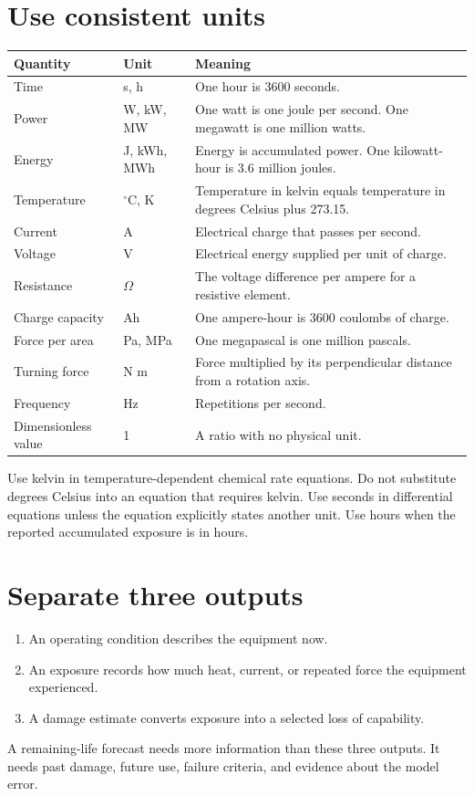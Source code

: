 \documentclass[11pt,a4paper]{report}
\begin{document}
\section{Use consistent units}
\begin{longtable}{L{0.22\textwidth}L{0.19\textwidth}L{0.49\textwidth}}
\toprule Quantity & Unit & Meaning \\ \midrule\endhead
Time & s, h & One hour is 3600 seconds. \\
Power & W, kW, MW & One watt is one joule per second. One megawatt is one million watts. \\
Energy & J, kWh, MWh & Energy is accumulated power. One kilowatt-hour is 3.6 million joules. \\
Temperature & $^{\circ}$C, K & Temperature in kelvin equals temperature in degrees Celsius plus 273.15. \\
Current & A & Electrical charge that passes per second. \\
Voltage & V & Electrical energy supplied per unit of charge. \\
Resistance & $\Omega$ & The voltage difference per ampere for a resistive element. \\
Charge capacity & Ah & One ampere-hour is 3600 coulombs of charge. \\
Force per area & Pa, MPa & One megapascal is one million pascals. \\
Turning force & N m & Force multiplied by its perpendicular distance from a rotation axis. \\
Frequency & Hz & Repetitions per second. \\
Dimensionless value & 1 & A ratio with no physical unit. \\
\bottomrule
\end{longtable}

Use kelvin in temperature-dependent chemical rate equations.
Do not substitute degrees Celsius into an equation that requires kelvin.
Use seconds in differential equations unless the equation explicitly states another unit.
Use hours when the reported accumulated exposure is in hours.

\section{Separate three outputs}
\begin{enumerate}
\item An operating condition describes the equipment now.
\item An exposure records how much heat, current, or repeated force the equipment experienced.
\item A damage estimate converts exposure into a selected loss of capability.
\end{enumerate}
A remaining-life forecast needs more information than these three outputs.
It needs past damage, future use, failure criteria, and evidence about the model error.
\end{document}
